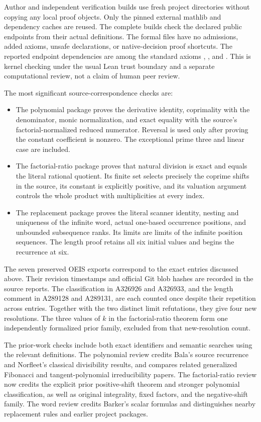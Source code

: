 \documentclass[11pt]{article}
\begin{document}
Author and independent verification builds use fresh project
directories without copying any local proof objects. Only the
pinned external mathlib and dependency caches are reused. The
complete builds check the declared public endpoints from their
actual definitions. The formal files have no admissions, added
axioms, unsafe declarations, or native-decision proof shortcuts.
The reported endpoint dependencies are among the standard axioms
, , and .
This is kernel checking under the usual Lean trust boundary and
a separate computational review, not a claim of human peer review.

The most significant source-correspondence checks are:
\begin{itemize}
\item The polynomial package proves the derivative identity,
coprimality with the denominator, monic normalization, and exact
equality with the source's factorial-normalized reduced numerator.
Reversal is used only after proving the constant coefficient is
nonzero. The exceptional prime three and linear case are included.
\item The factorial-ratio package proves that natural division is
exact and equals the literal rational quotient. Its finite set
selects precisely the coprime shifts in the source, its constant
is explicitly positive, and its valuation argument controls the
whole product with multiplicities at every index.
\item The replacement package proves the literal scanner identity,
nesting and uniqueness of the infinite word, actual one-based
occurrence positions, and unbounded subsequence ranks. Its limits
are limits of the infinite position sequences. The length proof
retains all six initial values and begins the recurrence at six.
\end{itemize}

The seven preserved OEIS exports correspond to the exact entries
discussed above. Their revision timestamps and official Git blob
hashes are recorded in the source reports. The classification in
A326926 and A326933, and the length comment in A289128 and
A289131, are each counted once despite their repetition across
entries. Together with the two distinct limit refutations, they
give four new resolutions. The three values of $k$ in the
factorial-ratio theorem form one independently formalized prior
family, excluded from that new-resolution count.

The prior-work checks include both exact identifiers and semantic
searches using the relevant definitions. The polynomial review
credits Bala's source recurrence and Norfleet's classical
divisibility results, and compares related generalized Fibonacci
and tangent-polynomial irreducibility papers. The factorial-ratio
review now credits the explicit prior positive-shift theorem and
stronger polynomial classification, as well as original integrality,
fixed factors, and the negative-shift family.
The word review credits Barker's scalar formulas and distinguishes
nearby replacement rules and earlier project packages.
\end{document}
